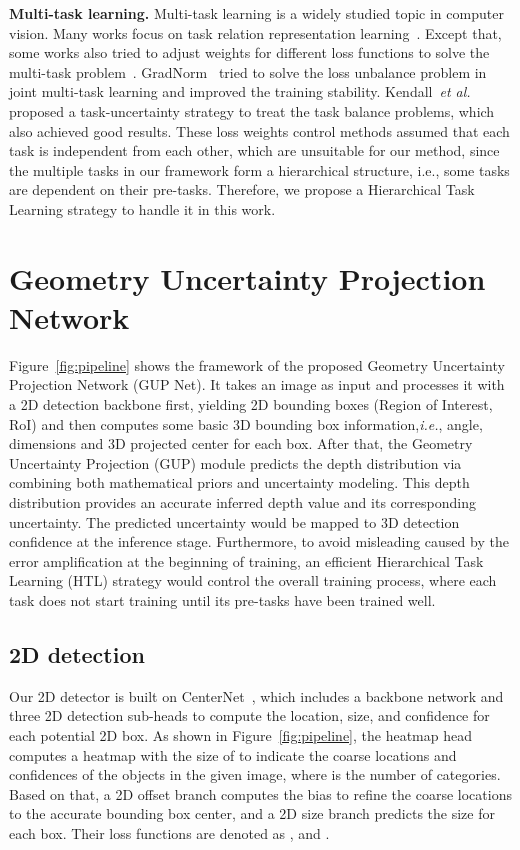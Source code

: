 \documentclass[10pt,twocolumn,letterpaper]{article}
\begin{document}
\noindent \textbf{Multi-task learning.} Multi-task learning is a widely studied topic in computer vision. Many works focus on task relation representation learning~\cite{long2015learning,vandenhende2020mti,xu2018pad,zamir2020robust,zamir2018taskonomy,zhang2019pattern}. Except that, some works also tried to adjust weights for different loss functions to solve the multi-task problem~\cite{chen2018gradnorm,kendall2018multi,zhang2014facial}. 
GradNorm~\cite{chen2018gradnorm} tried to solve the loss unbalance problem in joint multi-task learning and improved the training stability. Kendall~\emph{et al.}~\cite{kendall2018multi} proposed a task-uncertainty strategy to treat the task balance problems, which also achieved good results. These loss weights control methods assumed that each task is independent from each other, which are unsuitable for our method, since the multiple tasks in our framework form a hierarchical structure, i.e., some tasks are dependent on their pre-tasks. Therefore, we propose a Hierarchical Task Learning strategy to handle it in this work.
 \section{Geometry Uncertainty Projection Network}
Figure~\ref{fig:pipeline} shows the framework of the proposed Geometry Uncertainty Projection Network (GUP Net). It takes an image as input and processes it with a 2D detection backbone first, yielding 2D bounding boxes (Region of Interest, RoI) and then computes some basic 3D bounding box information,\textit{i.e.}, angle, dimensions and 3D projected center for each box. After that, the Geometry Uncertainty Projection (GUP) module predicts the depth distribution via combining both mathematical priors and uncertainty modeling. This depth distribution provides an accurate inferred depth value and its corresponding uncertainty. The predicted uncertainty would be mapped to 3D detection confidence at the inference stage. Furthermore, to avoid misleading caused by the error amplification at the beginning of training, an efficient Hierarchical Task Learning (HTL) strategy would control the overall training process, where each task does not start training until its pre-tasks have been trained well. 

\subsection{2D detection}
Our 2D detector is built on CenterNet~\cite{zhou2019objects}, which includes a backbone network and three 2D detection sub-heads to compute the location, size, and confidence for each potential 2D box.
As shown in Figure~\ref{fig:pipeline}, the heatmap head computes a heatmap with the size of  to indicate the coarse locations and confidences of the objects in the given image, where  is the number of categories.
Based on that, a 2D offset branch computes the bias  to refine the coarse locations to the accurate bounding box center, and a 2D size branch predicts the size  for each box. 
Their loss functions are denoted as ,  and . 
\end{document}
